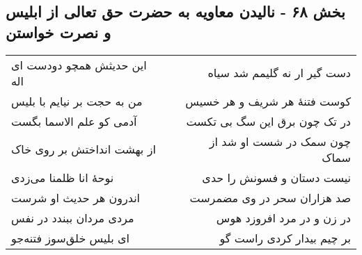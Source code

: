 \begin{center}
\section*{بخش ۶۸ - نالیدن معاویه به حضرت حق تعالی از ابلیس و نصرت خواستن}
\label{sec:sh068}
\begin{longtable}{l p{0.5cm} r}
این حدیثش همچو دودست ای اله
&&
دست گیر ار نه گلیمم شد سیاه
\\
من به حجت بر نیایم با بلیس
&&
کوست فتنهٔ هر شریف و هر خسیس
\\
آدمی کو علم الاسما بگست
&&
در تک چون برق این سگ بی تکست
\\
از بهشت انداختش بر روی خاک
&&
چون سمک در شست او شد از سماک
\\
نوحهٔ انا ظلمنا می‌زدی
&&
نیست دستان و فسونش را حدی
\\
اندرون هر حدیث او شرست
&&
صد هزاران سحر در وی مضمرست
\\
مردی مردان ببندد در نفس
&&
در زن و در مرد افروزد هوس
\\
ای بلیس خلق‌سوز فتنه‌جو
&&
بر چیم بیدار کردی راست گو
\\
\end{longtable}
\end{center}

